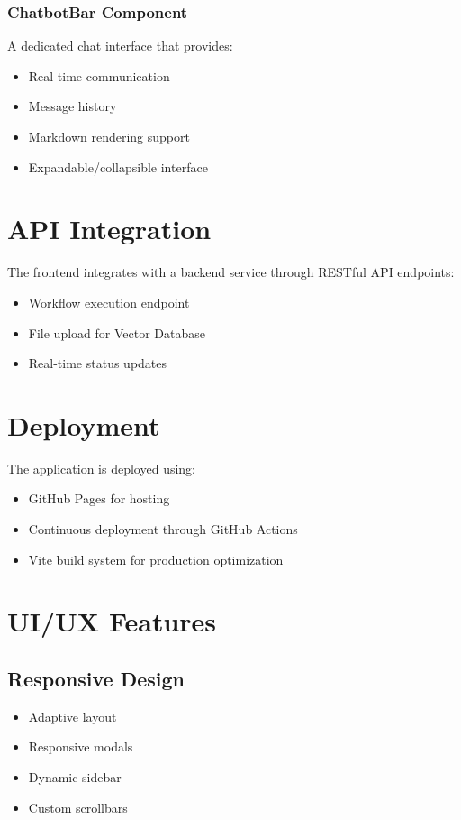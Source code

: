 \documentclass{article}
\begin{document}
\subsubsection{ChatbotBar Component}
A dedicated chat interface that provides:
\begin{itemize}
    \item Real-time communication
    \item Message history
    \item Markdown rendering support
    \item Expandable/collapsible interface
\end{itemize}

\section{API Integration}

The frontend integrates with a backend service through RESTful API endpoints:
\begin{itemize}
    \item Workflow execution endpoint
    \item File upload for Vector Database
    \item Real-time status updates
\end{itemize}

\section{Deployment}

The application is deployed using:
\begin{itemize}
    \item GitHub Pages for hosting
    \item Continuous deployment through GitHub Actions
    \item Vite build system for production optimization
\end{itemize}

\section{UI/UX Features}

\subsection{Responsive Design}
\begin{itemize}
    \item Adaptive layout
    \item Responsive modals
    \item Dynamic sidebar
    \item Custom scrollbars
\end{itemize}
\end{document}

